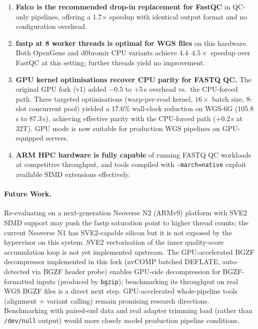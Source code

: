 \documentclass[a4paper,12pt]{article}
\begin{document}
\begin{enumerate}
  \item \textbf{Falco is the recommended drop-in replacement for FastQC} in
    QC-only pipelines, offering a 1.7$\times$ speedup with identical output
    format and no configuration overhead.

  \item \textbf{fastp at 8 worker threads is optimal for WGS files} on this
    hardware.  Both OpenGene and d0bromir CPU variants achieve $4.4$--$4.5\times$
    speedup over FastQC at this setting; further threads yield no improvement.

  \item \textbf{GPU kernel optimisations recover CPU parity for FASTQ QC.}
    The original GPU fork (v1) added $-0.5$ to $+5$\,s overhead vs.\ the
    CPU-forced path.  Three targeted optimisations (warp-per-read kernel,
    $16\times$ batch size, 8-slot concurrent pool) yielded a 17.6\% wall-clock
    reduction on WGS-6G (105.8\,s to 87.3\,s), achieving effective parity with
    the CPU-forced path ($+0.2$\,s at 32T).  GPU mode is now suitable for
    production WGS pipelines on GPU-equipped servers.

  \item \textbf{ARM HPC hardware is fully capable} of running FASTQ QC
    workloads at competitive throughput, and tools compiled with
    \texttt{-march=native} exploit available SIMD extensions effectively.
\end{enumerate}

\paragraph{Future Work.}
Re-evaluating on a next-generation Neoverse N2 (ARMv9) platform with SVE2
SIMD support may push the fastp saturation point to higher thread counts;
the current Neoverse N1 has SVE2-capable silicon but it is not exposed by
the hypervisor on this system.  SVE2 vectorisation of the inner quality-score
accumulation loop is not yet implemented upstream.  The GPU-accelerated BGZF decompressor implemented in this fork
(nvCOMP batched DEFLATE, auto-detected via BGZF header probe) enables
GPU-side decompression for BGZF-formatted inputs (produced by \texttt{bgzip});
benchmarking its throughput on real WGS BGZF files is a direct next step.
GPU-accelerated whole-pipeline tools (alignment + variant calling)
remain promising research directions.  Benchmarking with paired-end data and
real adapter trimming load (rather than \texttt{/dev/null} output) would more
closely model production pipeline conditions.
\end{document}

